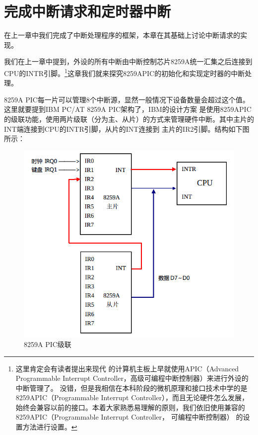 
\section {完成中断请求和定时器中断}

\par 在上一章中我们完成了中断处理程序的框架，本章在其基础上讨论中断请求的实现。

\par 我们在上一章中提到，外设的所有中断由中断控制芯片8259A统一汇集之后连接到CPU的INTR引脚。\footnote{这里肯定会有读者提出来现代\allowbreak
的计算机主板上早就使用APIC（Advanced Programmable Interrupt Controller，高级可编程中断控制器）来进行外设的中断管理了。\allowbreak
没错，但是我相信在本科阶段的微机原理和接口技术中学的是8259APIC（Programmable Interrupt Controller），而且无论硬件怎么发展，\allowbreak
始终会兼容以前的接口。本着大家熟悉易理解的原则，我们依旧使用兼容的8259APIC（Programmable Interrupt Controller， 可编程中断控制器）\allowbreak
的设置方法进行设置。}这章我们就来探究8259APIC的初始化和实现定时器的中断处理。

\par 8259A PIC每一片可以管理8个中断源，显然一般情况下设备数量会超过这个值。这里就要提到IBM PC/AT 8259A PIC架构了，IBM的设计方案\allowbreak
是使用8259APIC的级联功能，使用两片级联（分为主、从片）的方式来管理硬件中断。其中主片的INT端连接到CPU的INTR引脚，从片的INT连接到\allowbreak
主片的IR2引脚。结构如下图所示：
\begin{figure}[ht]
      \centering
      \includegraphics[scale=0.5]{picture/chapt8/8259A_PIC.png}
      \caption{8259A PIC级联}
\end{figure}

